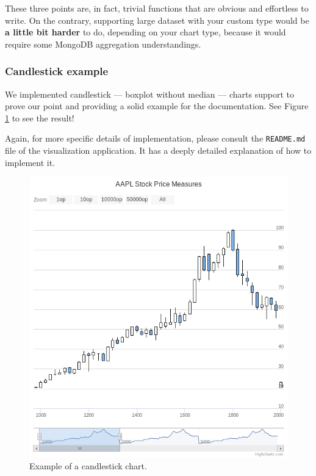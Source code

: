 \documentclass[a4paper,11pt]{report}
\begin{document}
These three points are, in fact, trivial functions that are obvious and effortless to write. On the contrary, supporting large dataset with your custom type would be \textbf{a little bit harder} to do, depending on your chart type, because it would require some MongoDB aggregation understandings.

\subsubsection{Candlestick example}

We implemented candlestick --- boxplot without median --- charts support to prove our point and providing a solid example for the documentation. See Figure \ref{candlestick} to see the result!

Again, for more specific details of implementation, please consult the \texttt{README.md} file of the visualization application. It has a deeply detailed explanation of how to implement it.

\begin{figure}[ht]
\begin{center}
\includegraphics[scale=0.45]{images/candlestick.png}
\caption{Example of a candlestick chart.}
\label{candlestick}
\end{center}
\end{figure}
\end{document}
